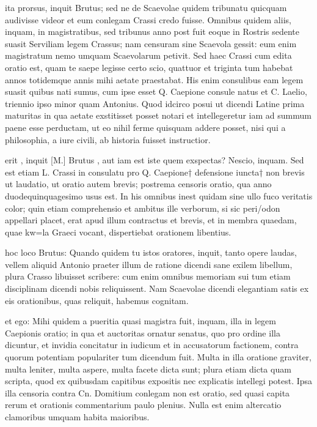  ita prorsus, inquit Brutus; sed ne de Scaevolae quidem tribunatu quicquam audivisse videor et eum conlegam Crassi credo fuisse. Omnibus quidem aliis, inquam, in magistratibus, sed tribunus anno post fuit eoque in Rostris sedente suasit Serviliam legem Crassus; nam censuram sine Scaevola gessit: eum enim magistratum nemo umquam Scaevolarum petivit. Sed haec Crassi cum edita oratio est, quam te saepe legisse certo scio, quattuor et triginta tum habebat annos totidemque annis mihi aetate praestabat. His enim consulibus eam legem suasit quibus nati sumus, cum ipse esset Q. Caepione consule natus et C. Laelio, triennio ipso minor quam Antonius. Quod idcirco posui ut dicendi Latine prima maturitas in qua aetate exstitisset posset notari et intellegeretur iam ad summum paene esse perductam, ut eo nihil ferme quisquam addere posset, nisi qui a philosophia, a iure civili, ab historia fuisset instructior.

 erit , inquit [M.] Brutus , aut iam est iste quem exspectas? Nescio, inquam. Sed est etiam L. Crassi in consulatu pro Q. Caepione† defensione iuncta† non brevis ut laudatio, ut oratio autem brevis; postrema censoris oratio, qua anno duodequinquagesimo usus est. In his omnibus inest quidam sine ullo fuco veritatis color; quin etiam comprehensio et ambitus ille verborum, si sic peri/odon appellari placet, erat apud illum contractus et brevis, et in membra quaedam, quae kw=la Graeci vocant, dispertiebat orationem libentius.

 hoc loco Brutus: Quando quidem tu istos oratores, inquit, tanto opere laudas, vellem aliquid Antonio praeter illum de ratione dicendi sane exilem libellum, plura Crasso libuisset scribere: cum enim omnibus memoriam sui tum etiam disciplinam dicendi nobis reliquissent. Nam Scaevolae dicendi elegantiam satis ex eis orationibus, quas reliquit, habemus cognitam.

 et ego: Mihi quidem a pueritia quasi magistra fuit, inquam, illa in legem Caepionis oratio; in qua et auctoritas ornatur senatus, quo pro ordine illa dicuntur, et invidia concitatur in iudicum et in accusatorum factionem, contra quorum potentiam populariter tum dicendum fuit. Multa in illa oratione graviter, multa leniter, multa aspere, multa facete dicta sunt; plura etiam dicta quam scripta, quod ex quibusdam capitibus expositis nec explicatis intellegi potest. Ipsa illa censoria contra Cn. Domitium conlegam non est oratio, sed quasi capita rerum et orationis commentarium paulo plenius. Nulla est enim altercatio clamoribus umquam habita maioribus.

